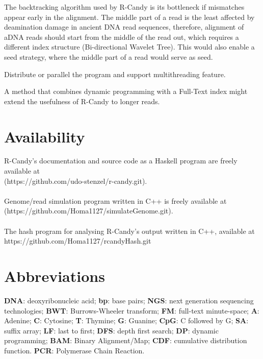 \documentclass[11pt,a4paper]{report}
\begin{document}
The backtracking algorithm used by R-Candy is its bottleneck if mismatches 
appear early in the alignment.  The middle part of a read is the least
affected by deamination damage in ancient DNA read sequences,
therefore, alignment of aDNA reads should start from the middle of the read 
out, which requires a different index structure (Bi-directional Wavelet Tree).
This would also enable a seed strategy, where the middle part of a read
would serve as seed.

Distribute or parallel the program and support multithreading feature.

A method that combines dynamic programming with a Full-Text index might extend
the usefulness of R-Candy to longer reads.


\section{Availability} \label{Availability}

R-Candy's documentation and source code as a Haskell program are freely
available at\\
 (https://github.com/udo-stenzel/r-candy.git).
\\\\
Genome/read simulation program written in C++ is freely available at
(https://github.com/Homa1127/simulateGenome.git).
\\\\
The hash program for analysing R-Candy's output written in C++, available at
https://github.com/Homa1127/rcandyHash.git




\section{Abbreviations} \label{Abbreviations}

\textbf{DNA}: deoxyribonucleic acid;
\textbf{bp}: base pairs;
\textbf{NGS}: next generation sequencing technologies;
\textbf{BWT}: Burrows-Wheeler transform;
\textbf{FM}: full-text minute-space;
\textbf{A}: Adenine;
\textbf{C}: Cytosine;
\textbf{T}: Thymine;
\textbf{G}: Guanine;
\textbf{CpG}: C followed by G;
\textbf{SA}: suffix array;
\textbf{LF}: last to first;
\textbf{DFS}: depth first search;
\textbf{DP}: dynamic programming;
\textbf{BAM}: Binary Alignment/Map;
\textbf{CDF}: cumulative distribution function.
\textbf{PCR}: Polymerase Chain Reaction.
\end{document}
